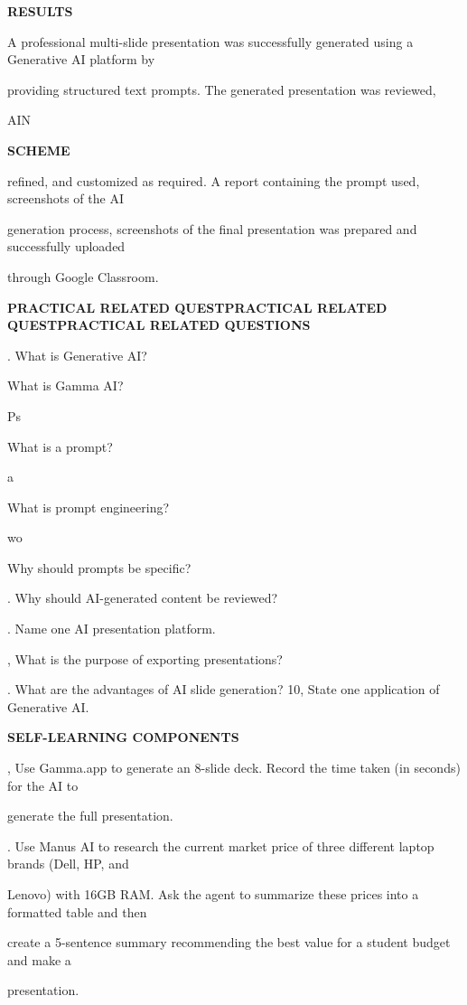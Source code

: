 \documentclass[10pt,a4paper]{article}
\begin{document}
\medskip\noindent\textbf{RESULTS}\par
\noindent A professional multi-slide presentation was successfully generated using a Generative AI platform by\par
\noindent providing structured text prompts. The generated presentation was reviewed,\par
\noindent AIN\par
\medskip\noindent\textbf{SCHEME}\par
\noindent refined, and customized as required. A report containing the prompt used, screenshots of the AI\par
\noindent generation process, screenshots of the final presentation was prepared and successfully uploaded\par
\noindent through Google Classroom.\par
\medskip\noindent\textbf{PRACTICAL RELATED QUESTPRACTICAL RELATED QUESTPRACTICAL RELATED QUESTIONS}\par
{}. What is Generative AI?\par
\noindent What is Gamma AI?\par
\noindent Ps\par
\noindent What is a prompt?\par
\clearpage
\noindent a\par
\noindent What is prompt engineering?\par
\noindent wo\par
\noindent Why should prompts be specific?\par
{}. Why should AI-generated content be reviewed?\par
{}. Name one AI presentation platform.\par
{}, What is the purpose of exporting presentations?\par
{}. What are the advantages of AI slide generation? 10, State one application of Generative AI.\par

\medskip\noindent\textbf{SELF-LEARNING COMPONENTS}\par
{}, Use Gamma.app to generate an 8-slide deck. Record the time taken (in seconds) for the AI to\par
\noindent generate the full presentation.\par
{}. Use Manus AI to research the current market price of three different laptop brands (Dell, HP, and\par
\noindent Lenovo) with 16GB RAM. Ask the agent to summarize these prices into a formatted table and then\par
\noindent create a 5-sentence summary recommending the best value for a student budget and make a\par
\noindent presentation.\par
\end{document}
